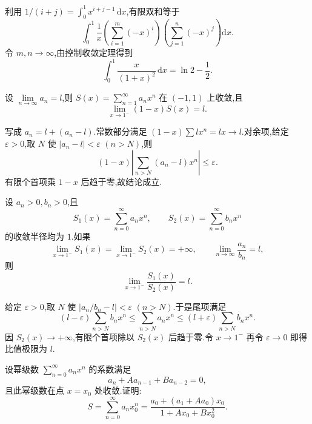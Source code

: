 \begin{solution}
    利用 $1/(i+j)=\displaystyle\int_0^1x^{i+j-1}\,\mathrm{d}x$,有限双和等于
    \[
        \displaystyle\int_0^1\dfrac{1}{x}
        \left(\sum\limits_{i=1}^m(-x)^i\right)
        \left(\sum\limits_{j=1}^n(-x)^j\right)\mathrm{d}x.
    \]
    令 $m,n\to\infty$,由控制收敛定理得到
    \[
        \displaystyle\int_0^1\dfrac{x}{(1+x)^2}\,\mathrm{d}x=\ln2-\dfrac{1}{2}.
    \]
\end{solution}

\begin{example}
    设 $\displaystyle\lim\limits_{n\to\infty}a_n=l$,则 $\displaystyle S(x)=\sum\limits_{n=1}^{\infty}a_nx^n$ 在 $(-1,1)$ 上收敛,且
    \[
        \displaystyle\lim\limits_{x\to1^-}(1-x)S(x)=l.
    \]
\end{example}
\exampleblank

\begin{solution}
    写成 $a_n=l+(a_n-l)$.常数部分满足
    $(1-x)\displaystyle\sum lx^n=lx\to l$.对余项,给定 $\varepsilon>0$,取 $N$ 使
    $|a_n-l|<\varepsilon$ $(n>N)$,则
    \[
        (1-x)\left|\sum\limits_{n>N}(a_n-l)x^n\right|\leq\varepsilon.
    \]
    有限个首项乘 $1-x$ 后趋于零,故结论成立.
\end{solution}

\begin{example}
    设 $a_n>0,b_n>0$,且
    \[
        S_1(x)=\sum\limits_{n=0}^{\infty}a_nx^n,
        \qquad
        S_2(x)=\sum\limits_{n=0}^{\infty}b_nx^n
    \]
    的收敛半径均为 $1$.如果
    \[
        \displaystyle\lim\limits_{x\to1^-}S_1(x)=\lim\limits_{x\to1^-}S_2(x)=+\infty,
        \qquad
        \lim\limits_{n\to\infty}\dfrac{a_n}{b_n}=l,
    \]
    则
    \[
        \displaystyle\lim\limits_{x\to1^-}\dfrac{S_1(x)}{S_2(x)}=l.
    \]
\end{example}
\exampleblank

\begin{solution}
    给定 $\varepsilon>0$,取 $N$ 使 $|a_n/b_n-l|<\varepsilon$ $(n>N)$.于是尾项满足
    \[
        (l-\varepsilon)\sum_{n>N}b_nx^n
        \leq\sum_{n>N}a_nx^n
        \leq(l+\varepsilon)\sum_{n>N}b_nx^n.
    \]
    因 $S_2(x)\to+\infty$,有限个首项除以 $S_2(x)$ 后趋于零.令 $x\to1^-$ 再令 $\varepsilon\to0$ 即得比值极限为 $l$.
\end{solution}

\begin{example}[\markstar]
    设幂级数 $\displaystyle\sum\limits_{n=0}^{\infty}a_nx^n$ 的系数满足
    \[
        a_n+Aa_{n-1}+Ba_{n-2}=0,
    \]
    且此幂级数在点 $x=x_0$ 处收敛.证明:
    \[
        S=\sum\limits_{n=0}^{\infty}a_nx_0^n
        =\dfrac{a_0+(a_1+Aa_0)x_0}{1+Ax_0+Bx_0^2}.
    \]
\end{example}
\exampleblank

